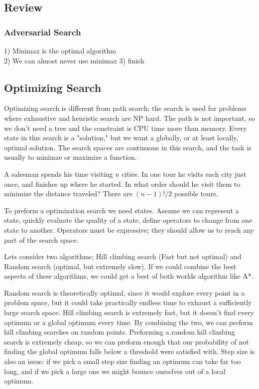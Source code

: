 \documentclass{chezarticle}
\begin{document}
\subsection{Review}
\subsubsection{Adversarial Search}
1) Minimax is the optimal algorithm\\
2) We can almost never use minimax
3) finish

\subsection{Optimizing Search}
Optimizing search is different from path search; the search is used for problems where exhaustive and heuristic search are NP hard. The path is not important, so we don't need a tree and the constraint is CPU time more than memory. Every state in this search is a "solution," but we want a globally, or at least locally, optimal solution. The search spaces are continuous in this search, and the task is usually to minimze or maximize a function.\\
\begin{example}
A salesman spends his time visiting $n$ cities. In one tour he visits each city just once, and finishes up where he started. In what order should he visit them to minimize the distance traveled? There are $(n -1)!/2$ possible tours.
\end{example}
To preform a optimization search we need states. Assume we can represent a state, quickly evaluate the quality of a state, define operators to change from one state to another. Operators must be expressive; they should allow us to reach any part of the search space. 
\begin{proposition}
Lets consider two algorithms; Hill climbing search (Fast but not optimal) and Random search (optimal, but extremely slow). If we could combine the best aspects of these algorithms, we could get a best of both worlds algorithm like A*.
\end{proposition}
Random search is theoretically optimal, since it would explore every point in a problem space, but it could take practically endless time to exhaust a sufficiently large search space. Hill climbing search is extremely fast, but it doesn't find every optimum or a global optimum every time. By combining the two, we can preform hill climbing searches on random points. Preforming a random hill climbing search is extremely cheap, so we can preform enough that our probability of not finding the global optimum falls below a threshold were satisfied with. Step size is also an issue; if we pick a small step size finding an optimum can take far too long, and if we pick a large one we might bounce ourselves out of a local optimum. 
\end{document}
